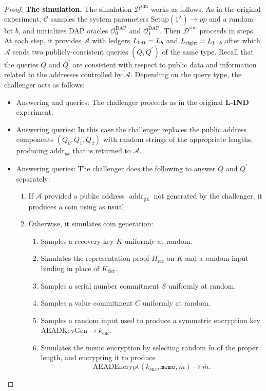 \documentclass{llncs}
\newcommand{\addr}{\operatorname{addr}}
\begin{document}
\begin{proof}
\textbf{The simulation.} The simulation $\mathcal{D}^{\text{sim}}$ works as follows.
As in the original experiment, $\mathcal{C}$ samples the system parameters $\text{Setup}(1^\lambda) \to pp$ and a random bit $b$, and initializes DAP oracles $\mathcal{O}^{\text{DAP}}_0$ and $\mathcal{O}^{\text{DAP}}_1$.
Then $\mathcal{D}^{\text{sim}}$ proceeds in steps.
At each step, it provides $\mathcal{A}$ with ledgers $L_{\text{\text{left}}} = L_{b}$ and $L_{\text{\text{right}}} = L_{1-b}$,after which $\mathcal{A}$ sends two publicly-consistent queries $(Q, Q^\prime)$ of the same type.
Recall that the queries $Q$ and $Q^\prime$ are consistent with respect to public data and information related to the addresses controlled by $\mathcal{A}$.
Depending on the query type, the challenger acts as follows:
\begin{itemize}
    \item Answering  and  queries: The challenger proceeds as in the original \textbf{L-IND} experiment.
    \item Answering  queries: In this case the challenger replaces the public address components $(Q_0,Q_1,Q_2)$ with random strings of the appropriate lengths, producing $\text{addr}_{pk}$ that is returned to $\mathcal{A}$.
    \item Answering  queries: The challenger does the following to answer $Q$ and $Q^\prime$ separately:
    \begin{enumerate}
        \item If $\mathcal{A}$ provided a public address $\addr_{\text{pk}}$ not generated by the challenger, it produces a coin using  as usual.
        \item Otherwise, it simulates coin generation:
        \begin{enumerate}
            \item Samples a recovery key $K$ uniformly at random.
            \item Simulates the representation proof $\Pi_{\text{rec}}$ on $K$ and a random input binding in place of $K_{\text{der}}$.
            \item Samples a serial number commitment $S$ uniformly at random.
            \item Samples a value commitment $C$ uniformly at random.
            \item Samples a random input used to produce a symmetric encryption key $\text{AEADKeyGen} \to k_{\text{enc}}$.
            \item Simulates the memo encryption by selecting random $\widetilde{m}$ of the proper length, and encrypting it to produce $$\text{AEADEncrypt}(k_{\text{enc}},\texttt{memo},\widetilde{m}) \to \overline{m}.$$

\end{enumerate}
\end{enumerate}
\end{itemize}
\end{proof}
\end{document}
